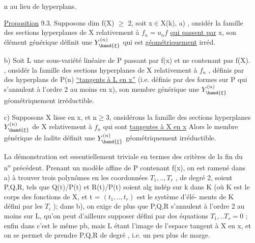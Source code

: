 
n  au lieu de  hyperplans.

\uline{Proposition} 9.3.  Supposons  dim f(X) $\geq$ 2,  soit x$\in$X(k),  
 a) , onsidér la famille  des sections hyperplanes
de X relativement à $f_n=u_nf$ \uline{qui passent par} x, son élément
générique  définit une $Y^{(n)}_{\hand{\xi}}$ qui est \uline{géométriquement} irréd.

b) 
 Soit L une sous-variété linéaire de P passant par f(x) et
ne contenant pas f(X). , onsidér la famille  des
sections hyperplanes de X relativement à  $f_n$  , définis
par des hyperplans de P(n)  \uline{``tangents à L en x''} (i.e. définis
par des formes sur P qui  s'annulent à l'ordre 2 au moins en x), son
membre générique   une $Y^{(n)}_{\hand{\xi}}$ géométriquement irréductible.

c) Supposons X lisse en x,  et  n$\geq$3,   onsidérons
la famille des sections hyperplanes   $Y^{(n)}_{\hand{\xi}}$ de X relativement
à $f_n$ qui sont \uline{tangentes à X en x} Alors le membre générique de ladite
définit une $Y^{(n)}_{\hand{\xi}}$ géométriquement irréductible.

La démonstration est essentiellement triviale en termes des
critères de la fin du n\textsuperscript{o} précédent. Prenant un modèle affine de P
contenant f(x), on est ramené dans a) à trouver  trois polynômes
en les coordonnées $T_1,..,T_r$ , de degré 2, soient P,Q,R, tels que
Q(t)/P(t) et R(t)/P(t) soient alg indép sur k dans K (où K est le
corps des fonctions de X, et t = $(t_1,..,t_r)$ est le système d'élé-%
ments de K défini par les $T_i$ ); dans b), on exige de plus que P,Q,R
s'annulent à l'ordre 2 au moins sur L, qu'on peut d'ailleurs supposer
défini par des équations $T_1,..T_s = 0$ ; enfin dans  c'est le même
pb, mais L étant l'image de l'espace tangent à X en x, et on se permet
 de prendre P,Q,R  de degré  , i.e. un peu plus de marge.

